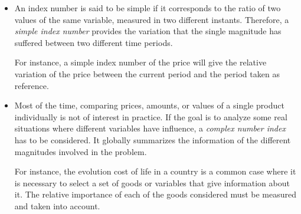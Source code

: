 \begin{itemize}
\item An index number is said to be simple if it corresponds to the ratio of two values of the same variable, measured in two different instants. Therefore, a \emph{simple index number} provides the variation that the single magnitude has suffered between two different time periods. 

For instance, a simple index number of the price will give the relative variation of the price between the current period and the period taken as reference. 

\item Most of the time,  comparing prices, amounts, or  values of a single product individually is not of interest in practice. If the goal is to analyze some real situations where different variables have influence, a \emph{complex number index} has to be considered. It globally summarizes the information of the different magnitudes involved in the problem. 

For instance, the evolution cost of life in a country is a common case where it is necessary to select a set of goods or variables that give information about it. The relative importance of each of the goods considered must be measured and taken into account.
\end{itemize}



